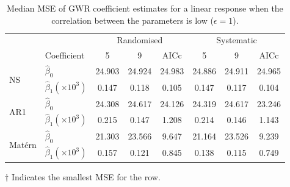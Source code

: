 \documentclass[a4paper]{article} 	%
\newcommand{\Matern}{Mat\'ern }
\begin{document}
\begin{table}[H]
	\centering
\begin{threeparttable}
	\caption{Median MSE of GWR coefficient estimates for a linear response when the correlation between the parameters is low ($\epsilon=1$).}\label{tb:MSElinear}
	\begin{tabular}{llcccccc}
		\toprule
		&  & \multicolumn{3}{c}{Randomised} & \multicolumn{3}{c}{Systematic} \\ 
   		 & Coefficient & 5  &  9  & AICc & 5   & 9  & AICc \\ \midrule
		\multirow{2}{*}{NS}   & $\hat{\beta}_0$ & 24.903 &	24.924 &	24.983&	24.886\tnote{$\dagger$} &	24.911 &	24.965 \\ 
		& $\hat{\beta}_1 (\times 10^3)$ & 0.147&	0.118&	0.105&	0.147&	0.117&	0.104\tnote{$\dagger$}  \\  \midrule
		\multirow{2}{*}{AR1}  & $\hat{\beta}_0$ & 24.308&	24.617&	24.126&	24.319&	24.617&	23.246\tnote{$\dagger$}  \\ 
		& $\hat{\beta}_1 (\times 10^3)$ & 0.215	&0.147	&1.208&	0.214&	0.146\tnote{$\dagger$}	&1.143 \\ \midrule
		\multirow{2}{*}{\Matern} & $\hat{\beta}_0$ & 21.303	&23.566	&9.647&	21.164&	23.526&	9.239\tnote{$\dagger$} \\ 
		& $\hat{\beta}_1 (\times 10^3)$ & 0.157	&0.121&	0.845&	0.138&	0.115\tnote{$\dagger$} &	0.749 \\
		\bottomrule
	\end{tabular}
	\begin{tablenotes}
	\item[$\dagger$] \footnotesize Indicates the smallest MSE for the row.
	\end{tablenotes}
\end{threeparttable}
\end{table}
\end{document}
